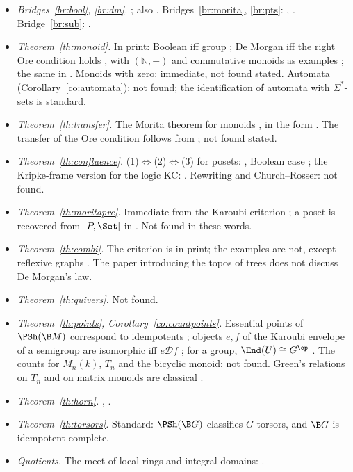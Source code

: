 \begin{itemize}
\item \emph{Bridges~\ref{br:bool}, \ref{br:dm}.} \cite[D4.6.3(a)]{elephant}; also \cite[Prop.~14]{caramello-chamoun}. Bridges~\ref{br:morita}, \ref{br:pts}: \cite[A1.1.9--10]{elephant}, \cite[Cor.~4.2]{rogers-1905}. Bridge~\ref{br:sub}: \cite[ch.~3]{caramello-tst}.
\item \emph{Theorem~\ref{th:monoid}.} In print: Boolean iff group \cite[Thm~2.4]{hemelaer-rogers}; De Morgan iff the right Ore condition holds \cite[Thm~2.31]{hemelaer-rogers}, with $(\mathbb N,+)$ and commutative monoids as examples \cite[Ex.~2.33, Table~2]{hemelaer-rogers}; the same in \cite{rogers-thesis}. Monoids with zero: immediate, not found stated. Automata (Corollary~\ref{co:automata}): not found; the identification of automata with $\Sigma^*$-sets is standard.
\item \emph{Theorem~\ref{th:transfer}.} The Morita theorem for monoids \cite{knauer,banaschewski}, in the form  \cite[Cor.~6.6]{rogers-1905}. The transfer of the Ore condition follows from \cite[Thm~2.31]{hemelaer-rogers}; not found stated.
\item \emph{Theorem~\ref{th:confluence}.} (1)$\Leftrightarrow$(2)$\Leftrightarrow$(3) for posets: \cite[Prop.~7.10(ii)]{caramello-stone}, Boolean case \cite[Prop.~7.8(ii)]{caramello-stone}; the Kripke-frame version for the logic KC: \cite{chagrov}. Rewriting and Church--Rosser: not found.
\item \emph{Theorem~\ref{th:moritapre}.} Immediate from the Karoubi criterion \cite[A1.1.9--10]{elephant}; a poset is recovered from $[P,\Set]$ in \cite[\S4.1]{caramello-stone}. Not found in these words.
\item \emph{Theorem~\ref{th:combi}.} The criterion is in print; the examples are not, except reflexive graphs \cite[Ex.~2.52]{hemelaer-rogers}. The paper introducing the topos of trees \cite{birkedal} does not discuss De Morgan's law.
\item \emph{Theorem~\ref{th:quivers}.} Not found.
\item \emph{Theorem~\ref{th:points}, Corollary~\ref{co:countpoints}.} Essential points of $\PSh(\B M)$ correspond to idempotents \cite[Cor.~4.2]{rogers-1905}; objects $e,f$ of the Karoubi envelope of a semigroup are isomorphic iff $e\mathrel{\mathcal D}f$ \cite[Prop.~3.1, \S3.2]{costa-steinberg}; for a group, $\End(U)\cong G^{\op}$ \cite{rogers-1905}. The counts for $M_n(k)$, $T_n$ and the bicyclic monoid: not found. Green's relations on $T_n$ and on matrix monoids are classical \cite{clifford-preston,ganyushkin}.
\item \emph{Theorem~\ref{th:horn}.} \cite[Thm~3.5]{caramello-demorgan}, \cite[Prop.~14]{caramello-chamoun}.
\item \emph{Theorem~\ref{th:torsors}.} Standard: $\PSh(\B G)$ classifies $G$-torsors, and $\B G$ is idempotent complete.
\item \emph{Quotients.} The meet of local rings and integral domains: \cite[\S18]{caramello-lattices}.
\end{itemize}

